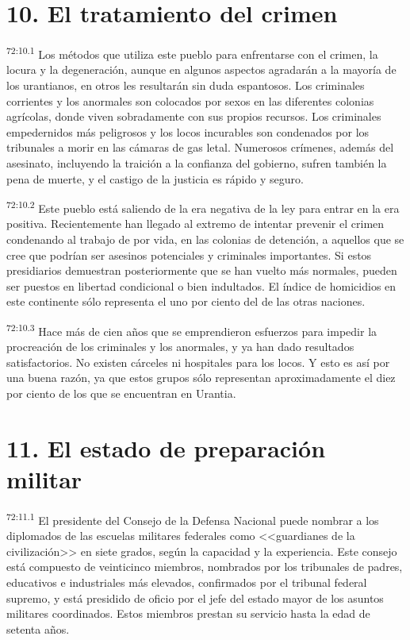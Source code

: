 \section*{10. El tratamiento del crimen}
\par
\textsuperscript{72:10.1} Los métodos que utiliza este pueblo para enfrentarse con el crimen, la locura y la degeneración, aunque en algunos aspectos agradarán a la mayoría de los urantianos, en otros les resultarán sin duda espantosos. Los criminales corrientes y los anormales son colocados por sexos en las diferentes colonias agrícolas, donde viven sobradamente con sus propios recursos. Los criminales empedernidos más peligrosos y los locos incurables son condenados por los tribunales a morir en las cámaras de gas letal. Numerosos crímenes, además del asesinato, incluyendo la traición a la confianza del gobierno, sufren también la pena de muerte, y el castigo de la justicia es rápido y seguro.

\par
\textsuperscript{72:10.2} Este pueblo está saliendo de la era negativa de la ley para entrar en la era positiva. Recientemente han llegado al extremo de intentar prevenir el crimen condenando al trabajo de por vida, en las colonias de detención, a aquellos que se cree que podrían ser asesinos potenciales y criminales importantes. Si estos presidiarios demuestran posteriormente que se han vuelto más normales, pueden ser puestos en libertad condicional o bien indultados. El índice de homicidios en este continente sólo representa el uno por ciento del de las otras naciones.

\par
\textsuperscript{72:10.3} Hace más de cien años que se emprendieron esfuerzos para impedir la procreación de los criminales y los anormales, y ya han dado resultados satisfactorios. No existen cárceles ni hospitales para los locos. Y esto es así por una buena razón, ya que estos grupos sólo representan aproximadamente el diez por ciento de los que se encuentran en Urantia.

\section*{11. El estado de preparación militar}
\par
\textsuperscript{72:11.1} El presidente del Consejo de la Defensa Nacional puede nombrar a los diplomados de las escuelas militares federales como <<guardianes de la civilización>> en siete grados, según la capacidad y la experiencia. Este consejo está compuesto de veinticinco miembros, nombrados por los tribunales de padres, educativos e industriales más elevados, confirmados por el tribunal federal supremo, y está presidido de oficio por el jefe del estado mayor de los asuntos militares coordinados. Estos miembros prestan su servicio hasta la edad de setenta años.

